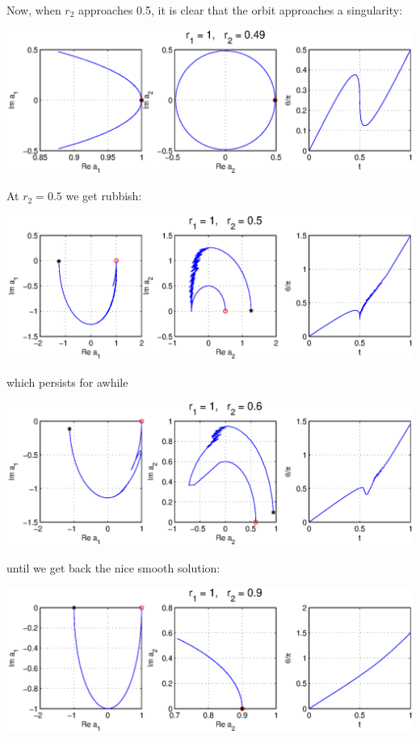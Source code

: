 Now, when $r_2$ approaches 0.5, it is clear that the orbit approaches a singularity:

\vspace{2ex}\noindent\includegraphics[width=\textwidth]{sliceflow3}

At $r_2 = 0.5$ we get rubbish:

\vspace{2ex}\noindent\includegraphics[width=\textwidth]{sliceflow4}

which persists for awhile

\vspace{2ex}\noindent\includegraphics[width=\textwidth]{sliceflow5}

until we get back the nice smooth solution:

\vspace{2ex}\noindent\includegraphics[width=\textwidth]{sliceflow6}

